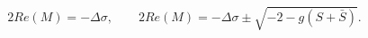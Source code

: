 \begin{equation}
2Re(M) = -\Delta \sigma, \qquad 
2Re(M) = -\Delta \sigma \pm \sqrt{-2-g(S+\bar S)} .
\end{equation}


